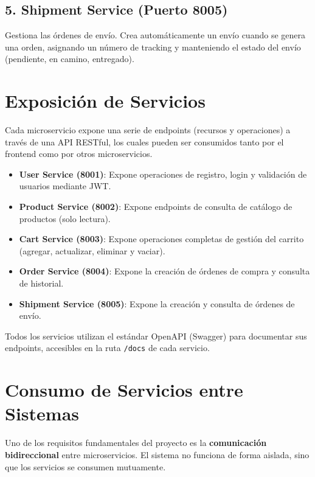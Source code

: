 \documentclass[11pt,a4paper]{article}
\begin{document}
\subsection{5. Shipment Service (Puerto 8005)}
Gestiona las órdenes de envío. Crea automáticamente un envío cuando se genera una orden, asignando un número de tracking y manteniendo el estado del envío (pendiente, en camino, entregado).

\section{Exposición de Servicios}

Cada microservicio expone una serie de endpoints (recursos y operaciones) a través de una API RESTful, los cuales pueden ser consumidos tanto por el frontend como por otros microservicios.

\begin{itemize}
    \item \textbf{User Service (8001)}: Expone operaciones de registro, login y validación de usuarios mediante JWT.
    \item \textbf{Product Service (8002)}: Expone endpoints de consulta de catálogo de productos (solo lectura).
    \item \textbf{Cart Service (8003)}: Expone operaciones completas de gestión del carrito (agregar, actualizar, eliminar y vaciar).
    \item \textbf{Order Service (8004)}: Expone la creación de órdenes de compra y consulta de historial.
    \item \textbf{Shipment Service (8005)}: Expone la creación y consulta de órdenes de envío.
\end{itemize}

Todos los servicios utilizan el estándar OpenAPI (Swagger) para documentar sus endpoints, accesibles en la ruta \texttt{/docs} de cada servicio.

\section{Consumo de Servicios entre Sistemas}

Uno de los requisitos fundamentales del proyecto es la \textbf{comunicación bidireccional} entre microservicios. El sistema no funciona de forma aislada, sino que los servicios se consumen mutuamente.
\end{document}
